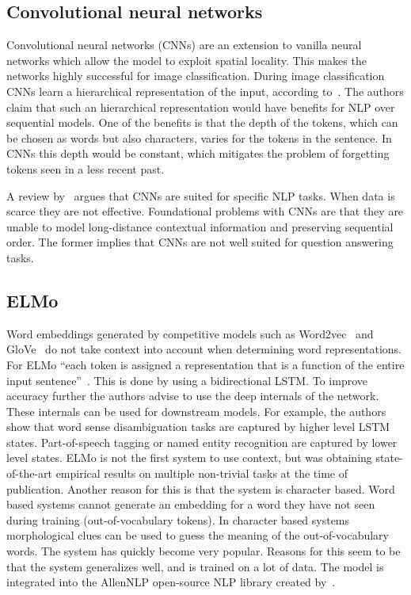 \subsection{Convolutional neural networks}
\label{subsec:cnn}
Convolutional neural networks (CNNs) are an extension to vanilla neural networks which allow the model to exploit spatial locality.
This makes the networks highly successful for image classification.
During image classification CNNs learn a hierarchical representation of the input, according to~\citet{conneau2016very}.
The authors claim that such an hierarchical representation would have benefits for NLP over sequential models.
One of the benefits is that the depth of the tokens, which can be chosen as words but also characters, varies for the tokens in the sentence.
In CNNs this depth would be constant, which mitigates the problem of forgetting tokens seen in a less recent past.

A review by~\citet{young2018recent} argues that CNNs are suited for specific NLP tasks.
When data is scarce they are not effective.
Foundational problems with CNNs are that they are unable to model long-distance contextual information and preserving sequential order.
The former implies that CNNs are not well suited for question answering tasks.

\subsection{ELMo}
\label{subsec:elmo}
Word embeddings generated by competitive models such as Word2vec~\citep{mikolov2013distributed} and GloVe~\citep{pennington2014} do not take context into account when determining word representations.
For ELMo ``each token is assigned a representation that is a function of the entire input sentence''~\citep{peters2018}.
This is done by using a bidirectional LSTM.
To improve accuracy further the authors advise to use the deep internals of the network.
These internals can be used for downstream models.
For example, the authors show that word sense disambiguation tasks are captured by higher level LSTM states.
Part-of-speech tagging or named entity recognition are captured by lower level states.
ELMo is not the first system to use context, but was obtaining state-of-the-art empirical results on multiple non-trivial tasks at the time of publication.
Another reason for this is that the system is character based.
Word based systems cannot generate an embedding for a word they have not seen during training (out-of-vocabulary tokens).
In character based systems morphological clues can be used to guess the meaning of the out-of-vocabulary words.
The system has quickly become very popular.
Reasons for this seem to be that the system generalizes well, and is trained on a lot of data.
The model is integrated into the AllenNLP open-source NLP library created by~\citet{gardner2017}.

